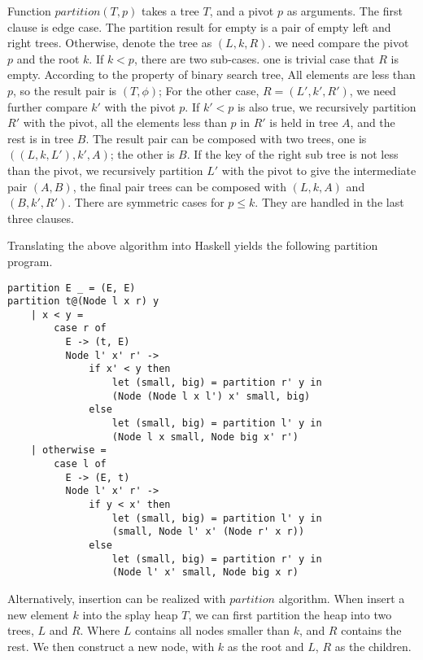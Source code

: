 \documentclass{article}
\begin{document}
Function $partition(T, p)$ takes a tree $T$, and a pivot $p$ as arguments.
The first clause is edge case. The partition result for empty is
a pair of empty left and right trees. Otherwise, denote the tree
as $(L, k, R)$. we need compare the pivot $p$ and the root $k$.
If $k < p$, there are two sub-cases. one is trivial case that
$R$ is empty. According to the property of binary search tree,
All elements are less than $p$, so the result pair is $(T, \phi)$;
For the other case, $R = (L', k', R')$, we need further compare
$k'$ with the pivot $p$. If $k' < p$ is also true, we recursively
partition $R'$ with the pivot, all the elements less than $p$ in
$R'$ is held in tree $A$, and the rest is in tree $B$. The
result pair can be composed with two trees, one is $((L, k, L'), k', A)$;
the other is $B$. If the key of the right sub tree is not less than
the pivot, we recursively partition $L'$ with the pivot to give
the intermediate pair $(A, B)$, the final pair trees can be
composed with $(L, k, A)$ and $(B, k', R')$. There are symmetric
cases for $p \leq k$. They are handled in the last three clauses.

Translating the above algorithm into Haskell yields the following partition
program.

\begin{lstlisting}
partition E _ = (E, E)
partition t@(Node l x r) y
    | x < y =
        case r of
          E -> (t, E)
          Node l' x' r' ->
              if x' < y then
                  let (small, big) = partition r' y in
                  (Node (Node l x l') x' small, big)
              else
                  let (small, big) = partition l' y in
                  (Node l x small, Node big x' r')
    | otherwise =
        case l of
          E -> (E, t)
          Node l' x' r' ->
              if y < x' then
                  let (small, big) = partition l' y in
                  (small, Node l' x' (Node r' x r))
              else
                  let (small, big) = partition r' y in
                  (Node l' x' small, Node big x r)
\end{lstlisting}

Alternatively, insertion can be realized with $partition$ algorithm.
When insert a new element $k$ into
the splay heap $T$, we can first partition the heap into two trees, $L$ and $R$. Where
$L$ contains all nodes smaller than $k$, and $R$ contains the rest.
We then construct a new node, with $k$ as the root and $L$, $R$ as the children.
\end{document}
